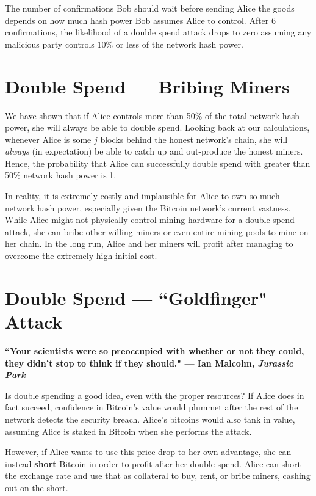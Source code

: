 \documentclass[full.tex]{subfiles}
\begin{document}
    The number of confirmations Bob should wait before sending Alice the goods depends on how much hash power Bob assumes Alice to control. After 6 confirmations, the likelihood of a double spend attack drops to zero assuming any malicious party controls 10\% or less of the network hash power. 
    
    \section*{Double Spend --- Bribing Miners}
    
    We have shown that if Alice controls more than 50\% of the total network hash power, she will always be able to double spend. Looking back at our calculations, whenever Alice is some $j$ blocks behind the honest network's chain, she will \textit{always} (in expectation) be able to catch up and out-produce the honest miners. Hence, the probability that Alice can successfully double spend with greater than 50\% network hash power is 1.
    
    In reality, it is extremely costly and implausible for Alice to own so much network hash power, especially given the Bitcoin network's current vastness. While Alice might not physically control mining hardware for a double spend attack, she can bribe other willing miners or even entire mining pools to mine on her chain. In the long run, Alice and her miners will profit after managing to overcome the extremely high initial cost.
    
    \section*{Double Spend --- ``Goldfinger" Attack}
    
    \textbf{``Your scientists were so preoccupied with whether or not they could, they didn’t stop to think if they should." --- Ian Malcolm, \textit{Jurassic Park}}
    
    Is double spending a good idea, even with the proper resources? If Alice does in fact succeed, confidence in Bitcoin's value would plummet after the rest of the network detects the security breach. Alice's bitcoins would also tank in value, assuming Alice is staked in Bitcoin when she performs the attack. 
    
    However, if Alice wants to use this price drop to her own advantage, she can instead \textbf{short} Bitcoin in order to profit after her double spend. Alice can short the exchange rate and use that as collateral to buy, rent, or bribe miners, cashing out on the short.
    
\end{document}
